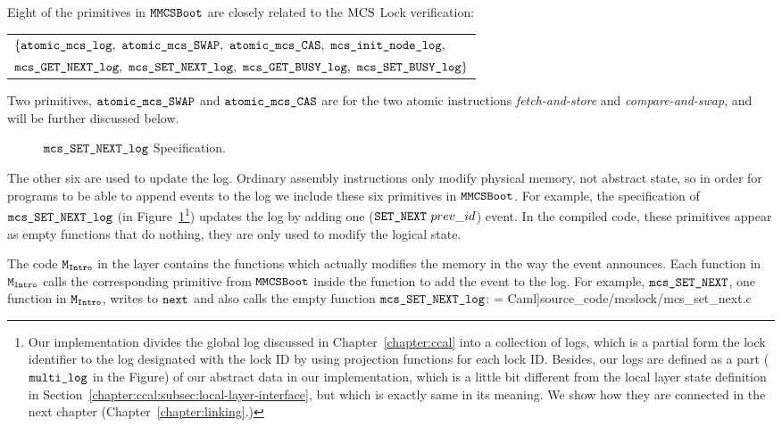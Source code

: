 Eight of the primitives in ${\mathrm{\texttt{MMCSBoot}}}$  are closely related to the $\mathrm{MCS}$ Lock verification:

\begin{center}
\begin{tabular}{P{0.95\textwidth}}
$\{\atomicmcslog,\  \atomicmcsswap,\ \atomicmcscas,\ \mcsinitnodelog,$\\
$\mcsgetnextlog,\ \mcssetnextlog,\ \mcsgetbusylog,\ \mcssetbusylog\} $\\
\end{tabular}
\end{center}

Two primitives, ${\mathrm{\texttt{atomic\_mcs\_SWAP}}}$ and ${\mathrm{\texttt{atomic\_mcs\_CAS}}}$ are for the two atomic instructions {\em fetch-and-store} and {\em compare-and-swap}, and will be further discussed below.

\begin{figure}
\begin{center}
 
\end{center}
\caption{${\mathrm{\texttt{mcs\_SET\_NEXT\_log}}}$ Specification.}
\label{fig:chapter:mcslock:specification-of-mcssetnextlog}
\end{figure}

The other six are used to update the log.  
Ordinary assembly instructions only modify physical memory, not
abstract state, so in order for programs to be able to append events to
the log we include these six primitives in ${\mathrm{\texttt{MMCSBoot}}}$. 
For example, the specification of ${\mathrm{\texttt{mcs\_SET\_NEXT\_log}}}$ (in Figure~\ref{fig:chapter:mcslock:specification-of-mcssetnextlog}\footnote{Our implementation divides the global log discussed in Chapter~\ref{chapter:ccal} into a collection of logs, which is a partial form the lock identifier to the log designated with the lock ID by using projection functions for each lock ID. Besides, our logs are defined as a part (${\mathrm{\texttt{multi\_log}}}$ in the Figure) of our abstract data in our implementation, which is a little bit different from the local layer state definition in Section~\ref{chapter:ccal:subsec:local-layer-interface}, but which is exactly same in its meaning. We show how they are connected in the next chapter  (Chapter~\ref{chapter:linking}.)})
updates the log by adding one (${\mathrm{\texttt{SET\_NEXT}}}~{prev\_id}$) event.
In the compiled code, these primitives appear as empty functions that do nothing, they are only used to modify the logical state.

The code ${\mathrm{\texttt{M}}}_{{\mathrm{\texttt{Intro}}}}$ in the layer contains the 
functions which actually modifies the memory in the way the event announces.
Each function in ${\mathrm{\texttt{M}}}_{{\mathrm{\texttt{Intro}}}}$ calls the corresponding primitive from
${\mathrm{\texttt{MMCSBoot}}}$ inside the function to add the event to the log.
For example, ${\mathrm{\texttt{mcs\_SET\_NEXT}}}$, one function in ${\mathrm{\texttt{M}}}_{{\mathrm{\texttt{Intro}}}}$, writes
to ${\mathrm{\texttt{next}}}$ and also calls
the empty function ${\mathrm{\texttt{mcs\_SET\_NEXT\_log}}}$:
 = Caml]{source_code/mcslock/mcs_set_next.c}


